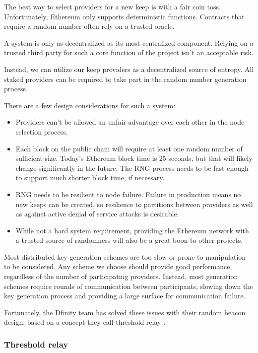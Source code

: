 \documentclass[11pt]{article}
\begin{document}
The best way to select providers for a new keep is with a fair coin
toss. Unfortunately, Ethereum only supports deterministic functions.
Contracts that require a random number often rely on a trusted oracle.

A system is only as decentralized as its most centralized component.
Relying on a trusted third party for such a core function of the
project isn't an acceptable risk.

Instead, we can utilize our keep providers as a decentralized source
of entropy. All staked providers can be required to take part in the
random number generation process.

There are a few design considerations for such a system:
\begin{itemize}
  \item Providers can't be allowed an unfair advantage over each other
      in the node selection process.
  \item Each block on the public chain will require at least one
      random number of sufficient size. Today's Ethereum block time is
      25 seconds, but that will likely change significantly in the
      future. The RNG process needs to be fast enough to support much
      shorter block time, if necessary.
  \item RNG needs to be resilient to node failure. Failure in
      production means no new keeps can be created, so resilience
      to partitions between providers as well as against active denial
      of service attacks is desirable.
  \item While not a hard system requirement, providing the Ethereum
      network with a trusted source of randomness will also be a great
      boon to other projects.
\end{itemize}

Most distributed key generation schemes are too slow or prone to
manipulation to be considered. Any scheme we choose should provide
good performance, regardless of the number of participating providers.
Instead, most generation schemes require rounds of communication
between participants, slowing down the key generation process and
providing a large surface for communication failure.

Fortunately, the Dfinity team has solved these issues with their
random beacon design, based on a concept they call threshold relay
\cite{thresholdRelay}.

\subsubsection{Threshold relay}
\end{document}
